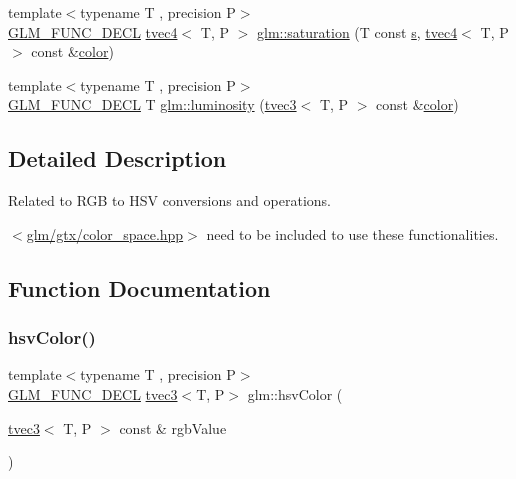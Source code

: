 \begin{DoxyCompactItemize}
\item 
{\footnotesize template$<$typename T , precision P$>$ }\\\mbox{\hyperlink{setup_8hpp_ab2d052de21a70539923e9bcbf6e83a51}{G\+L\+M\+\_\+\+F\+U\+N\+C\+\_\+\+D\+E\+CL}} \mbox{\hyperlink{structglm_1_1tvec4}{tvec4}}$<$ T, P $>$ \mbox{\hyperlink{group__gtx__color__space_ga2033e0566c595230714af396744e8a61}{glm\+::saturation}} (T const \mbox{\hyperlink{glad_8h_af1b1d5edfea6a34daee7389b1b5810ad}{s}}, \mbox{\hyperlink{structglm_1_1tvec4}{tvec4}}$<$ T, P $>$ const \&\mbox{\hyperlink{glad_8h_a69995a929d818b8b467d4593c24d98bc}{color}})
\item 
{\footnotesize template$<$typename T , precision P$>$ }\\\mbox{\hyperlink{setup_8hpp_ab2d052de21a70539923e9bcbf6e83a51}{G\+L\+M\+\_\+\+F\+U\+N\+C\+\_\+\+D\+E\+CL}} T \mbox{\hyperlink{group__gtx__color__space_gaa2f38a5100c3e1c7d39920df43bd8cbe}{glm\+::luminosity}} (\mbox{\hyperlink{structglm_1_1tvec3}{tvec3}}$<$ T, P $>$ const \&\mbox{\hyperlink{glad_8h_a69995a929d818b8b467d4593c24d98bc}{color}})
\end{DoxyCompactItemize}


\subsection{Detailed Description}
Related to R\+GB to H\+SV conversions and operations. 

$<$\mbox{\hyperlink{gtx_2color__space_8hpp}{glm/gtx/color\+\_\+space.\+hpp}}$>$ need to be included to use these functionalities. 

\subsection{Function Documentation}
\mbox{\label{group__gtx__color__space_gae72039c00a7be2f03a3b94b37a54349a}} 
\subsubsection{\texorpdfstring{hsvColor()}{hsvColor()}}
{\footnotesize\ttfamily template$<$typename T , precision P$>$ \\
\mbox{\hyperlink{setup_8hpp_ab2d052de21a70539923e9bcbf6e83a51}{G\+L\+M\+\_\+\+F\+U\+N\+C\+\_\+\+D\+E\+CL}} \mbox{\hyperlink{structglm_1_1tvec3}{tvec3}}$<$T, P$>$ glm\+::hsv\+Color (\begin{DoxyParamCaption}\item[{\mbox{\hyperlink{structglm_1_1tvec3}{tvec3}}$<$ T, P $>$ const \&}]{rgb\+Value }\end{DoxyParamCaption})}


